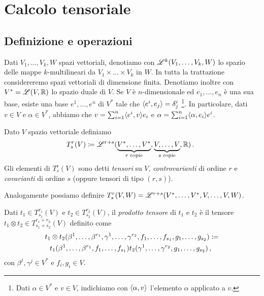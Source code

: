 \chapter{Calcolo tensoriale}

\section{Definizione e operazioni}
Dati $V_1,\ldots,V_k,W$ spazi vettoriali, denotiamo con $\mathscr L^k(V_1,\ldots,V_k,W)$ lo spazio delle mappe $k$-multilineari da $V_1\times\ldots\times V_k$ in $W$. In tutta la trattazione considereremo spazi vettoriali di dimensione finita.
Denotiamo inoltre con $V^* = \mathscr L(V,\mathbb R)$ lo spazio duale di $V$.
Se $V$ è $n$-dimensionale ed $e_1,\ldots,e_n$ è una sua base, esiste una base $e^1,\ldots,e^n$ di $V^*$ tale che $\langle e^i , e_j \rangle = \delta^i_j$ \footnote{Dati $\alpha \in V^*$ e $v\in V$, indichiamo con $\langle \alpha , v \rangle$ l'elemento $\alpha$ applicato a $v$.}.
In particolare, dati $v\in V$ e $\alpha \in V^*$, abbiamo che $v= \sum_{i=1}^n \langle e^i , v \rangle e_i$ e $\alpha= \sum_{i=1}^n \langle \alpha , e_i \rangle e^i$.

\begin{definition}   
	Dato $V$ spazio vettoriale definiamo 
	\begin{equation*}
	T_s^r(V) \coloneqq \mathscr L^{r+s} (\underbrace{V^*,\ldots,V^*}_{\text{$r$ copie}},\underbrace{V,\ldots,V}_{\text{$s$ copie}},\mathbb R) \, \text{. }
	\end{equation*}
	Gli elementi di $T_s^r(V)$ sono detti \emph{tensori} su $V$, \emph{controvarianti} di ordine $r$ e \emph{covarianti} di ordine $s$ (oppure tensori di tipo $(r,s)$).
\end{definition}

\begin{remark}
	Analogamente possiamo definire $T_s^r(V,W) = \mathscr L^{r+s} (V^*,\ldots,V^*,V,\ldots,V,W)$.
\end{remark}


\begin{definition} 
	Dati $t_1\in T_{s_1}^{r_1}(V)$ e $t_2\in T_{s_2}^{r_2}(V)$, il \emph{prodotto tensore} di $t_1$ e $t_2$ è il tensore $t_1\otimes t_2 \in T_{s_1+s_2}^{r_1+r_2}(V)$ definito come 
	\begin{multline*}
		t_1\otimes t_2(\beta^1,\ldots,\beta^{r_1},\gamma^1,\ldots,\gamma^{r_2}, f_1,\ldots,f_{s_1},g_1,\ldots,g_{s_2}) \coloneqq\\
		t_1(\beta^1,\ldots,\beta^{r_1},f_1,\ldots,f_{s_1})t_2(\gamma^1,\ldots,\gamma^{r_2},g_1,\ldots,g_{s_2}) \, \text{, }
	\end{multline*}
	con $\beta^j,\gamma^j\in V^*$ e $f_i,g_i\in V$.
\end{definition}

